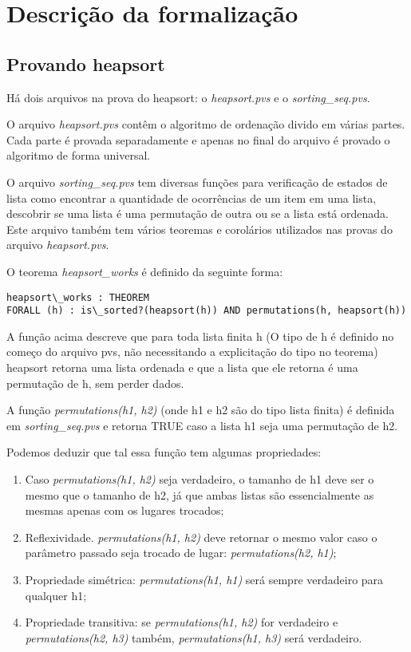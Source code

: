 \chapter{Descrição da formalização}

\section{Provando heapsort}

Há dois arquivos na prova do heapsort: o \textit{heapsort.pvs} e o \textit{sorting\_seq.pvs}.

O arquivo \textit{heapsort.pvs} contêm o algoritmo de ordenação divido em várias partes. Cada parte é provada separadamente e apenas no final do arquivo é provado o algoritmo de forma universal.

O arquivo \textit{sorting\_seq.pvs} tem diversas funções para verificação de estados de lista como encontrar a quantidade de ocorrências de um item em uma lista, descobrir se uma lista é uma permutação de outra ou se a lista está ordenada. Este arquivo também tem vários teoremas e corolários utilizados nas provas do arquivo \textit{heapsort.pvs}.

O teorema \textit{heapsort\_works} é definido da seguinte forma:

\begin{verbatim}
heapsort\_works : THEOREM 
FORALL (h) : is\_sorted?(heapsort(h)) AND permutations(h, heapsort(h))
\end{verbatim}

A função acima descreve que para toda lista finita h (O tipo de h é definido no começo do arquivo pvs, não necessitando a explicitação do tipo no teorema) heapsort retorna uma lista ordenada e que a lista que ele retorna é uma permutação de h, sem perder dados.

A função \textit{permutations(h1, h2)} (onde h1 e h2 são do tipo lista finita) é definida em \textit{sorting\_seq.pvs} e retorna TRUE caso a lista h1 seja uma permutação de h2. 

Podemos deduzir que tal essa função tem algumas propriedades:

\begin{enumerate}
    \item \label{lemma2} Caso \textit{permutations(h1, h2)} seja verdadeiro, o tamanho de h1 deve ser o mesmo que o tamanho de h2, já que ambas listas são essencialmente as mesmas apenas com os lugares trocados;
    \item \label{reflex} Reflexividade. \textit{permutations(h1, h2)} deve retornar o mesmo valor caso o parâmetro passado seja trocado de lugar: \textit{permutations(h2, h1)};
    \item \label{symetry} Propriedade simétrica: \textit{permutations(h1, h1)} será sempre verdadeiro para qualquer h1;
    \item \label{trans} Propriedade transitiva: se \textit{permutations(h1, h2)} for verdadeiro e \textit{permutations(h2, h3)} também, \textit{permutations(h1, h3)} será verdadeiro.
\end{enumerate}

